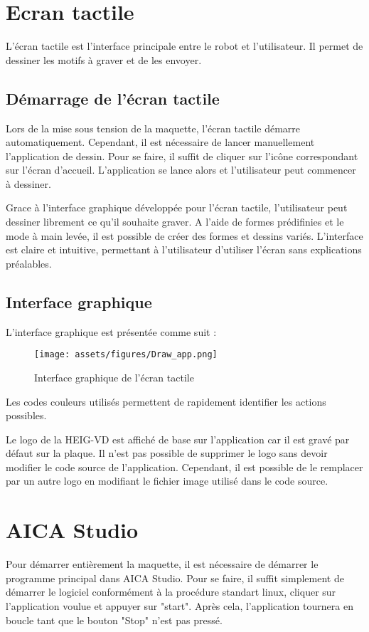 \section{Ecran tactile}

L'écran tactile est l'interface principale entre le robot et l'utilisateur. Il permet de dessiner les motifs à graver et de les envoyer.

\subsection{Démarrage de l'écran tactile}

Lors de la mise sous tension de la maquette, l'écran tactile démarre automatiquement. Cependant, il est nécessaire de lancer manuellement l'application de dessin. Pour se faire, il suffit de cliquer sur l'icône correspondant sur l'écran d'accueil. L'application se lance alors et l'utilisateur peut commencer à dessiner.

Grace à l'interface graphique développée pour l'écran tactile, l'utilisateur peut dessiner librement ce qu'il souhaite graver. A l'aide de formes prédifinies et le mode à main levée, il est possible de créer des formes et dessins variés. L'interface est claire et intuitive, permettant à l'utilisateur d'utiliser l'écran sans explications préalables.

\subsection{Interface graphique}

L'interface graphique est présentée comme suit :
\begin{figure}[H]
    \centering
    \texttt{[image: assets/figures/Draw\_app.png]}
    \caption{Interface graphique de l'écran tactile}
    \label{fig:interface_graphique}
\end{figure}

Les codes couleurs utilisés permettent de rapidement identifier les actions possibles.

Le logo de la HEIG-VD est affiché de base sur l'application car il est gravé par défaut sur la plaque. Il n'est pas possible de supprimer le logo sans devoir modifier le code source de l'application. Cependant, il est possible de le remplacer par un autre logo en modifiant le fichier image utilisé dans le code source.


\section{AICA Studio}
Pour démarrer entièrement la maquette, il est nécessaire de démarrer le programme principal dans AICA Studio. Pour se faire, il suffit simplement de démarrer le logiciel conformément à la procédure standart linux, cliquer sur l'application voulue et appuyer sur "start". Après cela, l'application tournera en boucle tant que le bouton "Stop" n'est pas pressé.

